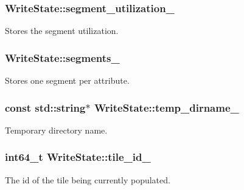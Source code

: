 \subsubsection[{segment\+\_\+utilization\+\_\+}]{ Write\+State\+::segment\+\_\+utilization\+\_\+\hspace{0.3cm}{\ttfamily [private]}}\label{classWriteState_a45a9a04b9520ed82c87322acfa94a72c}
Stores the segment utilization. \hypertarget{classWriteState_a4261c22f11c9f6bd4e5ef0ad91e13c90}{}
\subsubsection[{segments\+\_\+}]{ Write\+State\+::segments\+\_\+\hspace{0.3cm}{\ttfamily [private]}}\label{classWriteState_a4261c22f11c9f6bd4e5ef0ad91e13c90}
Stores one segment per attribute. \hypertarget{classWriteState_ac3c5f8a8d2b226f3cac8770fc665b63a}{}
\subsubsection[{temp\+\_\+dirname\+\_\+}]{\setlength{\rightskip}{0pt plus 5cm}const std\+::string$\ast$ Write\+State\+::temp\+\_\+dirname\+\_\+\hspace{0.3cm}{\ttfamily [private]}}\label{classWriteState_ac3c5f8a8d2b226f3cac8770fc665b63a}
Temporary directory name. \hypertarget{classWriteState_a6f1997f7702ccd133959484348faf49d}{}
\subsubsection[{tile\+\_\+id\+\_\+}]{\setlength{\rightskip}{0pt plus 5cm}int64\+\_\+t Write\+State\+::tile\+\_\+id\+\_\+\hspace{0.3cm}{\ttfamily [private]}}\label{classWriteState_a6f1997f7702ccd133959484348faf49d}
The id of the tile being currently populated. \hypertarget{classWriteState_ac794be3613148e959cc2dd138a06553d}{}
